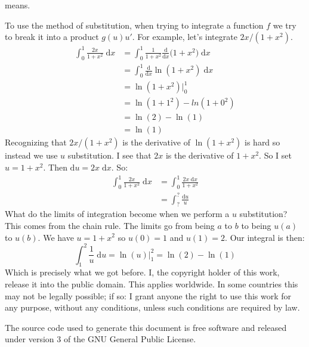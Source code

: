 \documentclass{article}
\theoremstyle{normal}
\theoremstyle{plain}
\begin{document}
    means.
    \par\hfill\par
    To use the method of substitution, when trying to integrate a function
    $f$ we try to break it into a product $g(u)u'$. For example, let's
    integrate $2x/(1+x^{2})$.
    \begin{align}
        \int_{0}^{1}\frac{2x}{1+x^{2}}\;\textrm{d}x
            &=\int_{0}^{1}\frac{1}{1+x^{2}}\frac{\textrm{d}}{\textrm{d}x}
                \big(1+x^{2}\big)\;\textrm{d}x\\
            &=\int_{0}^{1}\frac{\textrm{d}}{\textrm{d}x}
                \ln(1+x^{2})\;\textrm{d}x\\
            &=\ln(1+x^{2})\big|_{0}^{1}\\
            &=\ln(1+1^{2})-ln(1+0^{2})\\
            &=\ln(2)-\ln(1)\\
            &=\ln(1)
    \end{align}
    Recognizing that $2x/(1+x^{2})$ is the derivative of $\ln(1+x^{2})$ is hard
    so instead we use $u$ substitution. I see that
    $2x$ is the derivative of $1+x^{2}$. So I set $u=1+x^{2}$. Then
    $\textrm{d}u=2x\;\textrm{d}x$. So:
    \begin{align}
        \int_{0}^{1}\frac{2x}{1+x^{2}}\;\textrm{d}x
            &=\int_{0}^{1}\frac{2x\;\textrm{d}x}{1+x^{2}}\\
            &=\int_{?}^{?}\frac{\textrm{d}u}{u}
    \end{align}
    What do the limits of integration become when we perform a $u$ substitution?
    This comes from the chain rule. The limits go from being $a$ to $b$ to
    being $u(a)$ to $u(b)$. We have $u=1+x^{2}$ so $u(0)=1$ and $u(1)=2$.
    Our integral is then:
    \begin{equation}
        \int_{1}^{2}\frac{1}{u}\;\textrm{d}u=\ln(u)\big|_{1}^{2}
            =\ln(2)-\ln(1)
    \end{equation}
    Which is precisely what we got before.
    \newpage
    I, the copyright holder of this work, release it into the public domain.
    This applies worldwide. In some countries this may not be legally possible;
    if so: I grant anyone the right to use this work for any purpose, without
    any conditions, unless such conditions are required by law.
    \par\hfill\par
    The source code used to generate this document is free software and released
    under version 3 of the GNU General Public License.
\end{document}
